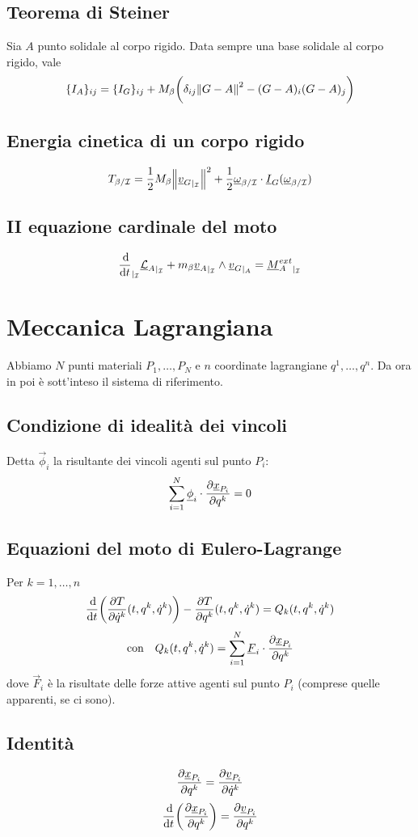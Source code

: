 \documentclass[11pt,landscape,a4paper]{article}
\begin{document}
\begin{multicols}{3}
    \subsection{Teorema di Steiner}
    Sia $A$ punto solidale al corpo rigido. Data sempre una base solidale al corpo rigido, vale 
        $$ \{I_A\}_{ij} = \{I_G\}_{ij} + M_\beta \bigg (\delta_{ij} \norm{G-A}^2 - (G-A)_i (G-A)_j \bigg)$$
    \subsection{Energia cinetica di un corpo rigido}
        $$T_{\beta/\mathcal{I}} = \frac 1 2 M_\beta \norm{{\underline{v} _G}_{\rvert_{\mathcal{I}}}}^2 + \frac 1 2 {\underline{\omega}}_{\beta/\mathcal{I}} \cdot \underline{I}_G(\underline{\omega}_{\beta/\mathcal{I}})$$
    \subsection{II equazione cardinale del moto}
        $$ {\ddt{}}_{\rvert_\I} {\vec{\mathcal{L}}_{A}}_{\rvert_\I} + m_\beta {\vec{v}_A}_{\rvert_\I} \wedge {\vec{v}_G}_{\rvert_A} = {\vec{M}^{ext}_A}_{\rvert_\I}$$

\section{Meccanica Lagrangiana}
    Abbiamo $N$ punti materiali $P_1,\dots, P_N$ e $n$ coordinate lagrangiane $q^1, \dots, q^n$. Da ora in poi è sott'inteso il sistema di riferimento.
    \subsection{Condizione di idealità dei vincoli}
        Detta $\vec \phi _i$ la risultante dei vincoli agenti sul punto $P_i$:
        $$ \sum_{i=1}^N \underline{\phi}_i \cdot \frac{\partial \underline{x}_{P_i}}{\partial q^k} = 0$$
    \subsection{Equazioni del moto di Eulero-Lagrange}
        Per $k = 1, \dots, n$
        $$\ddt{}\bigg( \de{T}{\dot q ^k}\diptre \bigg)- \de{T}{q^k}\diptre = Q_k (t, q^k , \dot q^k)$$
        $$ \text{con} \quad Q_k (t, q^k, \dot q ^k) = \sum_{i=1}^N \underline{F}_i\cdot \frac{\partial \underline{x}_{P_i}}{\partial q^k}$$
        dove $\vec F_i$ è la risultate delle forze attive agenti sul punto $P_i$ (comprese quelle apparenti, se ci sono).
    \subsection{Identità}
        $$\frac{\partial \underline{x}_{P_i}}{\partial q^k} = \frac{\partial \underline{v}_{P_i}}{\partial \dot q^k}$$
        $$ \ddt{}\bigg(\de{\vec x_{P_i}}{q^k}\bigg) = \de{\vec v_{P_i}}{q^k}$$

\end{multicols}
\end{document}
